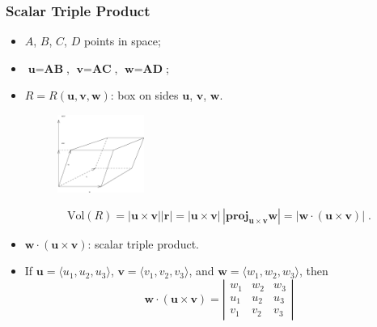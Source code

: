 \begin{frame}[label=current]
  \frametitle{Scalar Triple Product}

\begin{itemize}
 \item $A$, $B$, $C$, $D$ points in space;
  \item $\textbf{u} = \textbf{AB}$, $\textbf{v}=\textbf{AC}$, $\textbf{w}=\textbf{AD}$;
  \item $R=R(\textbf{u},\textbf{v},\textbf{w})$: box on sides $\textbf{u}$, $\textbf{v}$, $\textbf{w}$.\pause
%
\begin{figure}[h]
  \includegraphics[height=1in]{../../modules/vectors/pictures/ok-volume_box.eps}
\end{figure}
%
$$\text{Vol}(R) = |\textbf{u} \times \textbf{v}| |\textbf{r}| = |\textbf{u} \times \textbf{v}| \, |\textbf{proj}_{\bm{u} \times \bm{v}} \textbf{w}| =
|\textbf{w} \cdot (\textbf{u} \times \textbf{v})|\; .$$
%
\item $\textbf{w} \cdot (\textbf{u} \times \textbf{v})$: scalar triple product.

\item If $\textbf{u} =\langle u_1,u_2,u_3\rangle$,
$\textbf{v} =\langle v_1,v_2,v_3\rangle$, and $\textbf{w} =\langle w_1,w_2,w_3\rangle$, then
%
$$\textbf{w} \cdot (\textbf{u} \times \textbf{v}) = \left|
\begin{array}{ccc}
w_1 & w_2 & w_3 \\
u_1 & u_2 & u_3 \\
v_1 & v_2 & v_3
\end{array}
 \right|$$
\end{itemize}

\end{frame}